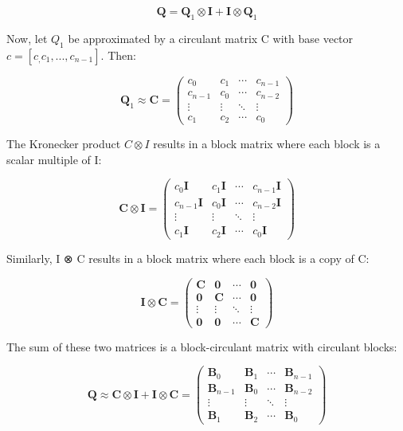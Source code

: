 \documentclass[journal=,manuscript=]{achemso}
\begin{document}
\[
\mathbf{Q} = \mathbf{Q}_1 \otimes \mathbf{I} + \mathbf{I} \otimes \mathbf{Q}_1
\]

Now, let \(Q_1\) be approximated by a circulant matrix C with base
vector \(c = [c_, c_1, ..., c_{n-1}]\). Then:

\[
\mathbf{Q}_1 \approx \mathbf{C} = 
\begin{pmatrix}
c_0 & c_1 & \cdots & c_{n-1} \\
c_{n-1} & c_0 & \cdots & c_{n-2} \\
\vdots & \vdots & \ddots & \vdots \\
c_1 & c_2 & \cdots & c_0
\end{pmatrix}
\]

The Kronecker product \(C \otimes I\) results in a block matrix where
each block is a scalar multiple of I:

\[
\mathbf{C} \otimes \mathbf{I} = 
\begin{pmatrix}
c_0\mathbf{I} & c_1\mathbf{I} & \cdots & c_{n-1}\mathbf{I} \\
c_{n-1}\mathbf{I} & c_0\mathbf{I} & \cdots & c_{n-2}\mathbf{I} \\
\vdots & \vdots & \ddots & \vdots \\
c_1\mathbf{I} & c_2\mathbf{I} & \cdots & c_0\mathbf{I}
\end{pmatrix}
\]

Similarly, I ⊗ C results in a block matrix where each block is a copy of
C:

\[
\mathbf{I} \otimes \mathbf{C} = 
\begin{pmatrix}
\mathbf{C} & \mathbf{0} & \cdots & \mathbf{0} \\
\mathbf{0} & \mathbf{C} & \cdots & \mathbf{0} \\
\vdots & \vdots & \ddots & \vdots \\
\mathbf{0} & \mathbf{0} & \cdots & \mathbf{C}
\end{pmatrix}
\]

The sum of these two matrices is a block-circulant matrix with circulant
blocks:

\[
\mathbf{Q} \approx \mathbf{C} \otimes \mathbf{I} + \mathbf{I} \otimes \mathbf{C} = 
\begin{pmatrix}
\mathbf{B}_0 & \mathbf{B}_1 & \cdots & \mathbf{B}_{n-1} \\
\mathbf{B}_{n-1} & \mathbf{B}_0 & \cdots & \mathbf{B}_{n-2} \\
\vdots & \vdots & \ddots & \vdots \\
\mathbf{B}_1 & \mathbf{B}_2 & \cdots & \mathbf{B}_0
\end{pmatrix}
\]
\end{document}
